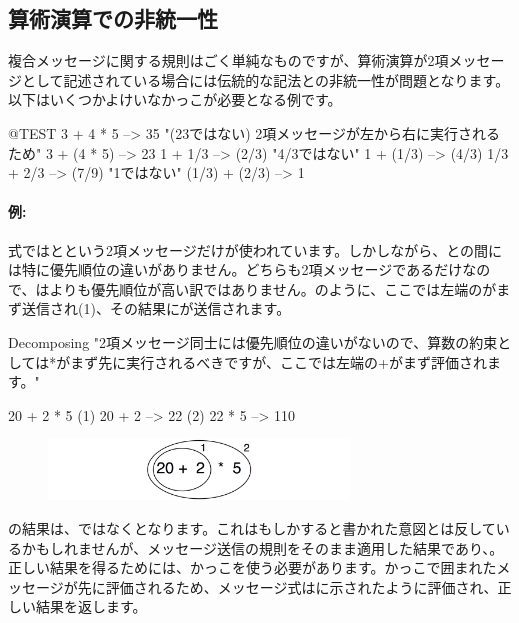 \documentclass[a4paper,10pt,twoside]{book}
\begin{document}
\subsection{算術演算での非統一性}
複合メッセージに関する規則はごく単純なものですが、算術演算が2項メッセージとして記述されている場合には伝統的な記法との非統一性が問題となります。以下はいくつかよけいなかっこが必要となる例です。

\begin{code}{@TEST}
3 + 4 * 5      --> 35    "(23ではない)  2項メッセージが左から右に実行されるため"
3 + (4 * 5)    --> 23
1 + 1/3         --> (2/3)    "4/3ではない"
1 + (1/3)       --> (4/3)
1/3 + 2/3       --> (7/9)    "1ではない"
(1/3) + (2/3)  --> 1
\end{code}

\paragraph{例:}
式では\ct{+}と\ct{*}という2項メッセージだけが使われています。しかしながら、\ct{+}と\ct{*}の間には特に優先順位の違いがありません。どちらも2項メッセージであるだけなので、\ct{*}は\ct{+}よりも優先順位が高い訳ではありません。のように、ここでは左端の\ct{+}がまず送信され(1)、その結果に\ct{*}が送信されます。

\begin{example}[binaryMessages1]{Decomposing }{}
"2項メッセージ同士には優先順位の違いがないので、算数の約束としては*がまず先に実行されるべきですが、ここでは左端の+がまず評価されます。"

      20 + 2 * 5 
(1)  20 + 2 --> 22
(2)  22       * 5 --> 110
\end{example}

\begin{figure}
\begin{center}\includegraphics[width=8cm]{ucompoNoBracketPar}\end{center}
\end{figure}
\noindent
{}の結果は、ではなくとなります。これはもしかすると書かれた意図とは反しているかもしれませんが、メッセージ送信の規則をそのまま適用した結果であり、。正しい結果を得るためには、かっこを使う必要があります。かっこで囲まれたメッセージが先に評価されるため、メッセージ式はに示されたように評価され、正しい結果を返します。
\end{document}
